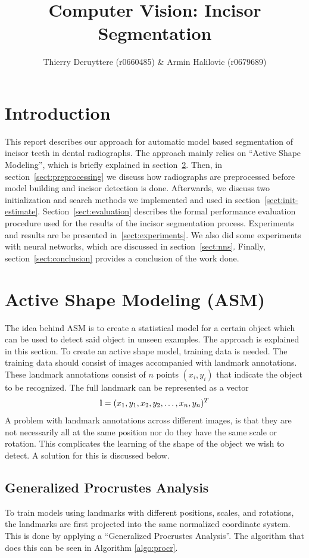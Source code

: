 \documentclass[a4paper]{article}
\title{Computer Vision: Incisor Segmentation}
\author{Thierry Deruyttere (r0660485) \& Armin Halilovic (r0679689)}
\begin{document}
\maketitle



\section{Introduction}
This report describes our approach for automatic model based segmentation of incisor teeth in dental radiographs.
The approach mainly relies on ``Active Shape Modeling'', which is briefly explained in section~\ref{sect:asm}.
Then, in section~\ref{sect:preprocessing} we discuss how radiographs are preprocessed before model building and incisor detection is done.
Afterwards, we discuss two initialization and search methods we implemented and used in section~\ref{sect:init-estimate}.
Section~\ref{sect:evaluation} describes the formal performance evaluation procedure used for the results of the incisor segmentation process.
Experiments and results are be presented in~\ref{sect:experiments}.
We also did some experiments with neural networks, which are discussed in section~\ref{sect:nns}.
Finally, section~\ref{sect:conclusion} provides a conclusion of the work done.



\section{Active Shape Modeling (ASM)}
\label{sect:asm}
The idea behind ASM is to create a statistical model for a certain object which can be used to detect said object in unseen examples. 
The approach is explained in this section.
To create an active shape model, training data is needed. 
The training data should consist of images accompanied with landmark annotations.
These landmark annotations consist of $n$ points $({x_i, y_i})$ that indicate the object to be recognized.
The full landmark can be represented as a vector 
\begin{equation}
\textnormal{\textbf{l}} = (x_1, y_1, x_2, y_2, \ldots, x_n, y_n)^T
\end{equation}
A problem with landmark annotations across different images, is that they are not necessarily all at the same position nor do they have the same scale or rotation. This complicates the learning of the shape of the object we wish to detect. A solution for this is discussed below.

\subsection{Generalized Procrustes Analysis}
To train models using landmarks with different positions, scales, and rotations, the landmarks are first projected into the same normalized coordinate system. 
This is done by applying a ``Generalized Procrustes Analysis''.
The algorithm that does this can be seen in Algorithm \ref{algo:procr}.
\end{document}
